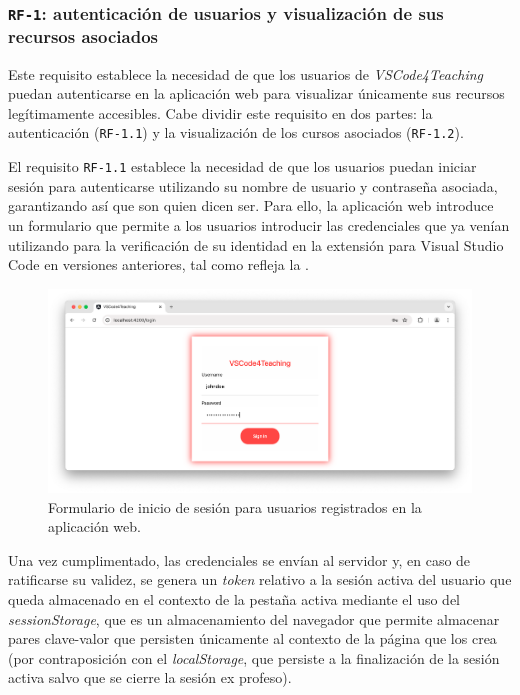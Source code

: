 \subsubsection{\texttt{RF-1}: autenticación de usuarios y visualización de sus recursos asociados}
\label{subsec:rf1}

Este requisito establece la necesidad de que los usuarios de \textit{VSCode4Teaching} puedan autenticarse en la aplicación web para visualizar únicamente sus recursos legítimamente accesibles. Cabe dividir este requisito en dos partes: la autenticación (\texttt{RF-1.1}) y la visualización de los cursos asociados (\texttt{RF-1.2}).

El requisito \texttt{RF-1.1} establece la necesidad de que los usuarios puedan iniciar sesión para autenticarse utilizando su nombre de usuario y contraseña asociada, garantizando así que son quien dicen ser. Para ello, la aplicación web introduce un formulario que permite a los usuarios introducir las credenciales que ya venían utilizando para la verificación de su identidad en la extensión para Visual Studio Code en versiones anteriores, tal como refleja la .

\begin{figure}[ht]
    \centering
    \includegraphics[width=\textwidth]{imagenes/utilizadas/4-3-implementacion/rf1-1.png}
    \caption{Formulario de inicio de sesión para usuarios registrados en la aplicación web.}
    \label{fig:reqf1-1}
\end{figure}

Una vez cumplimentado, las credenciales se envían al servidor y, en caso de ratificarse su validez, se genera un \textit{token} relativo a la sesión activa del usuario que queda almacenado en el contexto de la pestaña activa mediante el uso del \textit{sessionStorage}, que es un almacenamiento del navegador que permite almacenar pares clave-valor que persisten únicamente al contexto de la página que los crea (por contraposición con el \textit{localStorage}, que persiste a la finalización de la sesión activa salvo que se cierre la sesión ex profeso).

